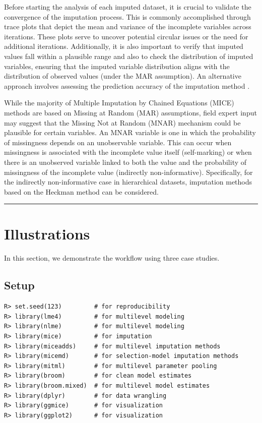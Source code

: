 \documentclass[
  article]{jss}
\begin{document}
Before starting the analysis of each imputed dataset, it is crucial to
validate the convergence of the imputation process. This is commonly
accomplished through trace plots that depict the mean and variance of
the incomplete variables across iterations. These plots serve to uncover
potential circular issues or the need for additional iterations.
Additionally, it is also important to verify that imputed values fall
within a plausible range and also to check the distribution of imputed
variables, ensuring that the imputed variable distribution aligns with
the distribution of observed values (under the MAR assumption). An
alternative approach involves assessing the prediction accuracy of the
imputation method \cite{cai2023}.

While the majority of Multiple Imputation by Chained Equations (MICE)
methods are based on Missing at Random (MAR) assumptions, field expert
input may suggest that the Missing Not at Random (MNAR) mechanism could
be plausible for certain variables. An MNAR variable is one in which the
probability of missingness depends on an unobservable variable. This can
occur when missingness is associated with the incomplete value itself
(self-marking) or when there is an unobserved variable linked to both
the value and the probability of missingness of the incomplete value
(indirectly non-informative). Specifically, for the indirectly
non-informative case in hierarchical datasets, imputation methods based
on the Heckman method can be
considered.\cite{hammon2020,hammon2022,munoz2023b}

\begin{center}\rule{0.5\linewidth}{0.5pt}\end{center}

\hypertarget{sec-illustrations}{%
\section{Illustrations}\label{sec-illustrations}}

In this section, we demonstrate the workflow using three case studies.

\hypertarget{setup}{%
\subsection{Setup}\label{setup}}

\begin{verbatim}
R> set.seed(123)         # for reproducibility
R> library(lme4)         # for multilevel modeling
R> library(nlme)         # for multilevel modeling
R> library(mice)         # for imputation
R> library(miceadds)     # for multilevel imputation methods
R> library(micemd)       # for selection-model imputation methods
R> library(mitml)        # for multilevel parameter pooling
R> library(broom)        # for clean model estimates
R> library(broom.mixed)  # for multilevel model estimates
R> library(dplyr)        # for data wrangling
R> library(ggmice)       # for visualization
R> library(ggplot2)      # for visualization
\end{verbatim}
\end{document}
